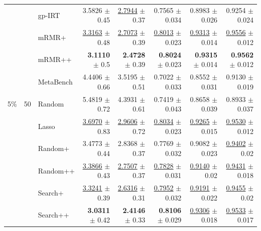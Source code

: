 \begin{longtable}{llp{}rrrrr}
 &  & gp-IRT & 3.5826 {\scriptsize $\pm$ 0.45} & \underline{2.7944} {\scriptsize $\pm$ 0.37} & 0.7565 {\scriptsize $\pm$ 0.034} & 0.8983 {\scriptsize $\pm$ 0.026} & 0.9254 {\scriptsize $\pm$ 0.024} \\
 &  & mRMR+ & \underline{3.3163} {\scriptsize $\pm$ 0.48} & \underline{2.7073} {\scriptsize $\pm$ 0.39} & \underline{0.8013} {\scriptsize $\pm$ 0.023} & \underline{0.9313} {\scriptsize $\pm$ 0.014} & \underline{0.9556} {\scriptsize $\pm$ 0.012} \\
 &  & mRMR++ & \textbf{3.1110} {\scriptsize $\pm$ 0.5} & \textbf{2.4728} {\scriptsize $\pm$ 0.39} & \textbf{0.8024} {\scriptsize $\pm$ 0.023} & \textbf{0.9315} {\scriptsize $\pm$ 0.014} & \textbf{0.9562} {\scriptsize $\pm$ 0.012} \\
 &  & MetaBench & 4.4406 {\scriptsize $\pm$ 0.66} & 3.5195 {\scriptsize $\pm$ 0.51} & 0.7022 {\scriptsize $\pm$ 0.033} & 0.8552 {\scriptsize $\pm$ 0.031} & 0.9130 {\scriptsize $\pm$ 0.019} \\
\midrule
5\% & 50 & Random & 5.4819 {\scriptsize $\pm$ 0.72} & 4.3931 {\scriptsize $\pm$ 0.61} & 0.7419 {\scriptsize $\pm$ 0.043} & 0.8658 {\scriptsize $\pm$ 0.039} & 0.8933 {\scriptsize $\pm$ 0.037} \\
 &  & Lasso & \underline{3.6970} {\scriptsize $\pm$ 0.83} & \underline{2.9606} {\scriptsize $\pm$ 0.72} & \underline{0.8034} {\scriptsize $\pm$ 0.023} & \underline{0.9265} {\scriptsize $\pm$ 0.015} & \underline{0.9530} {\scriptsize $\pm$ 0.012} \\
 &  & Random+ & 3.4773 {\scriptsize $\pm$ 0.44} & 2.8368 {\scriptsize $\pm$ 0.37} & 0.7769 {\scriptsize $\pm$ 0.032} & 0.9082 {\scriptsize $\pm$ 0.023} & \underline{0.9402} {\scriptsize $\pm$ 0.02} \\
 &  & Random++ & \underline{3.3866} {\scriptsize $\pm$ 0.43} & \underline{2.7507} {\scriptsize $\pm$ 0.37} & \underline{0.7828} {\scriptsize $\pm$ 0.031} & \underline{0.9140} {\scriptsize $\pm$ 0.02} & \underline{0.9431} {\scriptsize $\pm$ 0.018} \\
 &  & Search+ & \underline{3.3241} {\scriptsize $\pm$ 0.39} & \underline{2.6316} {\scriptsize $\pm$ 0.31} & \underline{0.7952} {\scriptsize $\pm$ 0.032} & \underline{0.9191} {\scriptsize $\pm$ 0.022} & \underline{0.9455} {\scriptsize $\pm$ 0.02} \\
 &  & Search++ & \textbf{3.0311} {\scriptsize $\pm$ 0.42} & \textbf{2.4146} {\scriptsize $\pm$ 0.33} & \textbf{0.8106} {\scriptsize $\pm$ 0.029} & \underline{0.9306} {\scriptsize $\pm$ 0.018} & \underline{0.9533} {\scriptsize $\pm$ 0.017} \\

\end{longtable}
